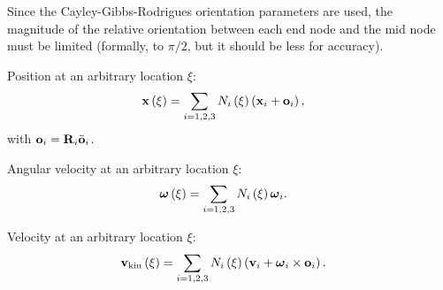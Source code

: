 Since the Cayley-Gibbs-Rodrigues orientation parameters are used,
the magnitude of the relative orientation between each end node
and the mid node must be limited (formally, to $\pi/2$,
but it should be less for accuracy).

Position at an arbitrary location $\xi$:
\begin{align}
	\bm{\mathbf{x}}\left( \xi \right)
	&=
	\sum_{i=1,2,3} N_i\left( \xi \right) \left( 
		\bm{\mathbf{x}}_i + \bm{\mathbf{o}}_i
	 \right)
	,
\end{align}
with $\bm{\mathbf{o}}_i=\bm{\mathbf{R}}_i \tilde{\bm{\mathbf{o}}}_i$.

Angular velocity at an arbitrary location $\xi$:
\begin{align}
	\bm{\mathbf{\omega}}\left( \xi \right)
	&=
	\sum_{i=1,2,3} N_i\left( \xi \right) \bm{\mathbf{\omega}}_i
	.
\end{align}

Velocity at an arbitrary location $\xi$:
\begin{align}
	\bm{\mathbf{v}}_{\text{kin}}\left( \xi \right)
	&=
	\sum_{i=1,2,3} N_i\left( \xi \right) \left( 
		\bm{\mathbf{v}}_i
		+ \bm{\mathbf{\omega}}_i \times \bm{\mathbf{o}}_i
	 \right)
	.
\end{align}

